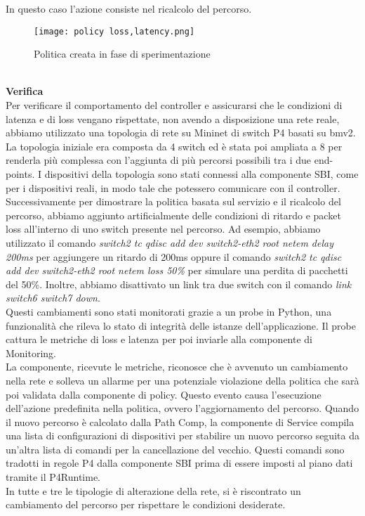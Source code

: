 In questo caso l'azione consiste nel ricalcolo del percorso.
\begin{figure}[h]
    \centering
   \texttt{[image: policy loss,latency.png]}
    \caption{Politica creata in fase di sperimentazione}
    \label{fig:policy}
\end{figure}
\\\textbf{Verifica}
\\Per verificare il comportamento del controller e assicurarsi che le condizioni di latenza e di loss vengano rispettate, 
non avendo a disposizione una rete reale, abbiamo utilizzato una topologia di rete su Mininet di switch P4 basati su bmv2.
La topologia iniziale era composta da 4 switch ed è stata poi ampliata a 8 per renderla più complessa con l'aggiunta di più percorsi possibili tra i due end-points.
I dispositivi della topologia sono stati connessi alla componente SBI, come per i dispositivi reali, in modo tale che potessero comunicare con il controller.
Successivamente per dimostrare la politica basata sul servizio e il ricalcolo del percorso, abbiamo aggiunto artificialmente delle condizioni di ritardo e packet loss all’interno di uno switch presente nel percorso. 
Ad esempio, abbiamo utilizzato il comando \textit{switch2 tc qdisc add dev switch2-eth2 root netem delay 200ms} per aggiungere un ritardo di 200ms oppure il comando \textit{switch2 tc qdisc add dev switch2-eth2 root netem loss 50\%}
 per simulare una perdita di pacchetti del 50\%. Inoltre, abbiamo disattivato un link tra due switch con il comando \textit{link switch6 switch7 down}.
\\Questi cambiamenti sono stati monitorati grazie a un probe in Python, una funzionalità che rileva lo stato di integrità delle istanze dell'applicazione.
Il probe cattura le metriche di loss e latenza per poi inviarle alla componente di Monitoring.
\\La componente, ricevute le metriche, riconosce che è avvenuto un cambiamento nella rete e solleva un allarme per una potenziale violazione della politica che sarà poi validata dalla componente di policy.
Questo evento causa l'esecuzione dell'azione predefinita nella politica, ovvero l'aggiornamento del percorso.
Quando il nuovo percorso è calcolato dalla Path Comp, la componente di Service compila una lista di configurazioni di dispositivi per stabilire un nuovo percorso
seguita da un'altra lista di comandi per la cancellazione del vecchio. Questi comandi sono tradotti in regole P4 dalla componente SBI prima di essere imposti al piano dati 
tramite il P4Runtime.
\\In tutte e tre le tipologie di alterazione della rete, si è riscontrato un cambiamento del percorso per rispettare le condizioni desiderate. 


